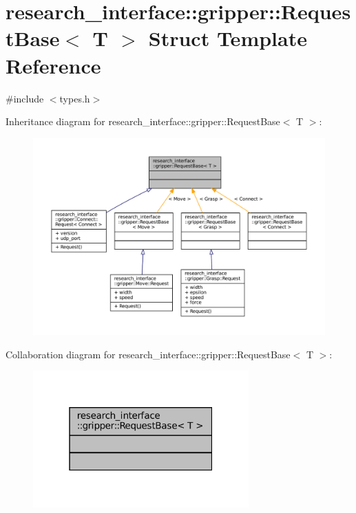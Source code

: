 \hypertarget{structresearch__interface_1_1gripper_1_1RequestBase}{}\section{research\+\_\+interface\+:\+:gripper\+:\+:Request\+Base$<$ T $>$ Struct Template Reference}
\label{structresearch__interface_1_1gripper_1_1RequestBase}


{\ttfamily \#include $<$types.\+h$>$}



Inheritance diagram for research\+\_\+interface\+:\+:gripper\+:\+:Request\+Base$<$ T $>$\+:
\nopagebreak
\begin{figure}[H]
\begin{center}
\leavevmode
\includegraphics[width=350pt]{structresearch__interface_1_1gripper_1_1RequestBase__inherit__graph}
\end{center}
\end{figure}


Collaboration diagram for research\+\_\+interface\+:\+:gripper\+:\+:Request\+Base$<$ T $>$\+:
\nopagebreak
\begin{figure}[H]
\begin{center}
\leavevmode
\includegraphics[width=235pt]{structresearch__interface_1_1gripper_1_1RequestBase__coll__graph}
\end{center}
\end{figure}



